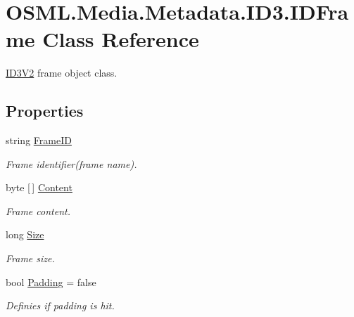 \hypertarget{classOSML_1_1Media_1_1Metadata_1_1ID3_1_1IDFrame}{}\section{O\+S\+M\+L.\+Media.\+Metadata.\+I\+D3.\+I\+D\+Frame Class Reference}
\label{classOSML_1_1Media_1_1Metadata_1_1ID3_1_1IDFrame}


\mbox{\hyperlink{classOSML_1_1Media_1_1Metadata_1_1ID3_1_1ID3V2}{I\+D3\+V2}} frame object class.  


\subsection*{Properties}
\begin{DoxyCompactItemize}
\item 
string \mbox{\hyperlink{classOSML_1_1Media_1_1Metadata_1_1ID3_1_1IDFrame_a1c36a668995c046ace4564f7a33a03fa}{Frame\+ID}}
\begin{DoxyCompactList}\small\item\em Frame identifier(frame name). \end{DoxyCompactList}\item 
byte \mbox{[}$\,$\mbox{]} \mbox{\hyperlink{classOSML_1_1Media_1_1Metadata_1_1ID3_1_1IDFrame_aa5c152921fc9907550146ead39f4e859}{Content}}
\begin{DoxyCompactList}\small\item\em Frame content. \end{DoxyCompactList}\item 
long \mbox{\hyperlink{classOSML_1_1Media_1_1Metadata_1_1ID3_1_1IDFrame_aa3ffb4beb1863f63830eb365edbfb507}{Size}}
\begin{DoxyCompactList}\small\item\em Frame size. \end{DoxyCompactList}\item 
bool \mbox{\hyperlink{classOSML_1_1Media_1_1Metadata_1_1ID3_1_1IDFrame_a2e206be9e411b558c7e4594c62a6d34c}{Padding}} = false
\begin{DoxyCompactList}\small\item\em Definies if padding is hit. \end{DoxyCompactList}\item 

\end{DoxyCompactItemize}
